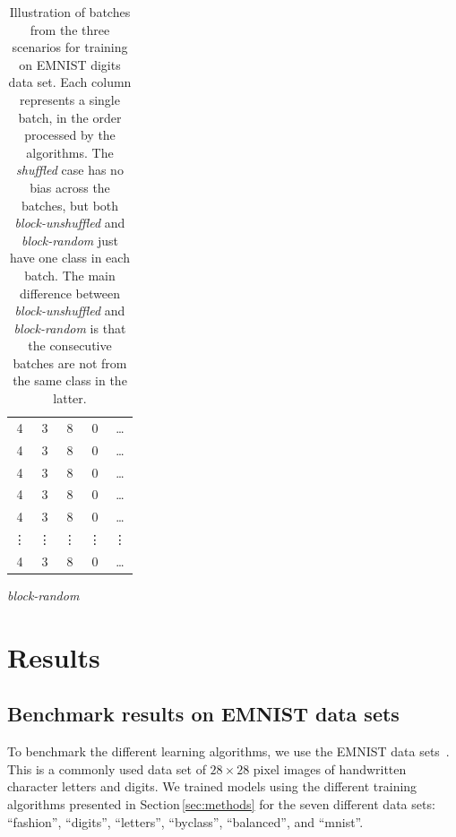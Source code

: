 \documentclass[review]{elsarticle}
\begin{document}
\begin{table}[!htb]
\begin{subtable}{.4\linewidth}
\begin{tabular}{ | c | c | c | c | c | }
            4 & 3 & 8 & 0 & \ldots \\
            4 & 3 & 8 & 0 & \ldots \\
            4 & 3 & 8 & 0 & \ldots \\
            4 & 3 & 8 & 0 & \ldots \\
            4 & 3 & 8 & 0 & \ldots \\
            \vdots & \vdots& \vdots & \vdots &  \vdots \\
            4 & 3 & 8 & 0 & \ldots \\
        \hline
        \end{tabular}
        \caption{\it block-random}
    \end{subtable}
    \caption{
    Illustration of batches from the three scenarios for training on EMNIST digits
    data set. Each column represents a single batch, in the order processed by the
    algorithms. The \textit{shuffled} case has no bias across the batches, but both
    \textit{block-unshuffled} and \textit{block-random} just have one class in each
    batch. The main difference between \textit{block-unshuffled} and
    \textit{block-random} is that the consecutive batches are not from the same
    class in the latter.}
    \label{table:illustration}
\end{table}

\section{Results}\label{sec:results}

\subsection{Benchmark results on EMNIST data sets}\label{sec:benchmarks}

To benchmark the different learning algorithms, we use the EMNIST data
sets~\cite{Cohen2017}. This is a commonly used data set of
$28 \times 28$ pixel images of handwritten character letters and
digits. We trained models using the different training algorithms
presented in Section\,\ref{sec:methods} for the seven different data
sets: ``fashion'', ``digits'', ``letters'', ``byclass'', ``balanced'',
and ``mnist''.
\end{document}
